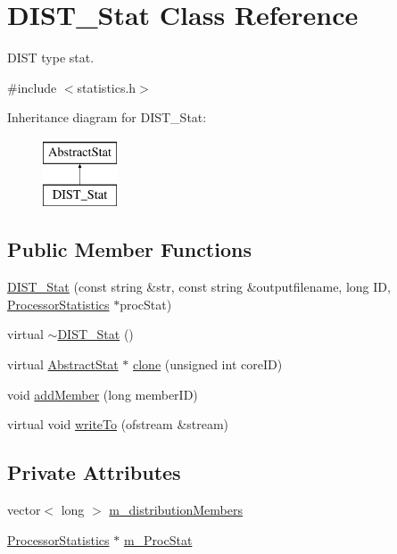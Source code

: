 \hypertarget{classDIST__Stat}{
\section{DIST\_\-Stat Class Reference}
\label{classDIST__Stat}
}


DIST type stat.  




{\ttfamily \#include $<$statistics.h$>$}

Inheritance diagram for DIST\_\-Stat:\begin{figure}[H]
\begin{center}
\leavevmode
\includegraphics[height=2.000000cm]{classDIST__Stat}
\end{center}
\end{figure}
\subsection*{Public Member Functions}
\begin{DoxyCompactItemize}
\item 
\hyperlink{classDIST__Stat_a0ecccb2dc9ba814f9468d3f814329b04}{DIST\_\-Stat} (const string \&str, const string \&outputfilename, long ID, \hyperlink{classProcessorStatistics}{ProcessorStatistics} $\ast$procStat)
\item 
virtual \hyperlink{classDIST__Stat_a223d849dc2df71d9909a5833bf17beb9}{$\sim$DIST\_\-Stat} ()
\item 
virtual \hyperlink{classAbstractStat}{AbstractStat} $\ast$ \hyperlink{classDIST__Stat_a11f5f75a5f6d8551e342a23e72f27809}{clone} (unsigned int coreID)
\item 
void \hyperlink{classDIST__Stat_a04d60f3b378b7c9439039abe2e2019d0}{addMember} (long memberID)
\item 
virtual void \hyperlink{classDIST__Stat_a521cb2140eba939df71b12dfe805386a}{writeTo} (ofstream \&stream)
\end{DoxyCompactItemize}
\subsection*{Private Attributes}
\begin{DoxyCompactItemize}
\item 
vector$<$ long $>$ \hyperlink{classDIST__Stat_a66b040153f6d5636d372b5bb3f0c6802}{m\_\-distributionMembers}
\item 
\hyperlink{classProcessorStatistics}{ProcessorStatistics} $\ast$ \hyperlink{classDIST__Stat_a867cb02e1feb40c13b29ab79746853e6}{m\_\-ProcStat}
\end{DoxyCompactItemize}


